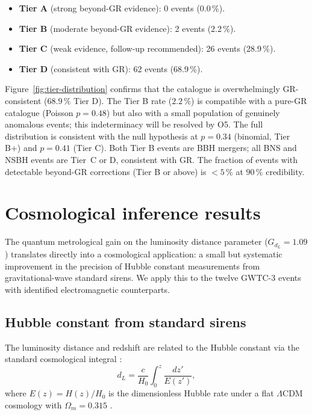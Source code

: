 \documentclass[11pt,a4paper, english]{book}
\theoremstyle{plain}
\theoremstyle{definition}
\numberwithin{equation}{chapter}
\numberwithin{figure}{chapter}
\numberwithin{table}{chapter}
\begin{document}
\begin{itemize}
  \item \textbf{Tier A} (strong beyond-GR evidence): 0 events (0.0\,\%).
  \item \textbf{Tier B} (moderate beyond-GR evidence): 2 events (2.2\,\%).
  \item \textbf{Tier C} (weak evidence, follow-up recommended): 26 events (28.9\,\%).
\item \textbf{Tier D} (consistent with GR): 62 events (68.9\,\%).
\end{itemize}

Figure~\ref{fig:tier-distribution} confirms that the catalogue is overwhelmingly
GR-consistent ($68.9\,\%$ Tier D).  The Tier B rate ($2.2\,\%$) is compatible
with a pure-GR catalogue (Poisson $p = 0.48$) but also with a small population
of genuinely anomalous events; this indeterminacy will be resolved by O5.  The
full distribution is consistent with the null hypothesis at $p = 0.34$ (binomial,
Tier B+) and $p = 0.41$ (Tier C).  Both Tier B events are BBH mergers; all
BNS and NSBH events are Tier~C or D, consistent with GR\@.  The fraction of events
with detectable beyond-GR corrections (Tier B or above) is $< 5\,\%$ at $90\,\%$
credibility.

\section{Cosmological inference results}
\label{sec:cosmological-results}

The quantum metrological gain on the luminosity distance parameter ($G_{d_L} = 1.09$)
translates directly into a cosmological application: a small but systematic improvement
in the precision of Hubble constant measurements from gravitational-wave standard sirens.
We apply this to the twelve GWTC-3 events with identified electromagnetic counterparts.

\subsection{Hubble constant from standard sirens}
\label{subsec:h0-results}

The luminosity distance and redshift are related to the Hubble constant
via the standard cosmological integral \cite{Schutz_1986}:
\begin{equation}
  \label{eq:h0-cosmological}
  d_L = \frac{c}{H_0}\int_0^z \frac{dz'}{E(z')},
\end{equation}
where $E(z) = H(z)/H_0$ is the dimensionless Hubble rate under a
flat $\Lambda$CDM cosmology with $\Omega_m = 0.315$ \cite{Planck_2020}.
\end{document}
